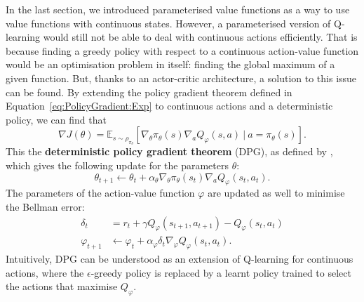 In the last section, we introduced parameterised value functions as a way to use value functions with continuous states. However, a parameterised version of Q-learning would still not be able to deal with continuous actions efficiently. That is because finding a greedy policy with respect to a continuous action-value function would be an optimisation problem in itself: finding the global maximum of a given function. But, thanks to an actor-critic architecture, a solution to this issue can be found. By extending the policy gradient theorem defined in Equation~\ref{eq:PolicyGradient:Exp} to continuous actions and a deterministic policy, we can find that
\begin{equation}
    \nabla J(\theta)=\mathbb{E}_{s\sim\rho_{\pi_\theta}}\left[\nabla_{\theta}\pi_\theta(s)\nabla_aQ_\varphi(s,a)\ |\ a=\pi_\theta(s)\right].
    \label{eq:DPG}
\end{equation}
This the \textbf{deterministic policy gradient theorem} (DPG), as defined by \cite{Silver2014_DPG}, which gives the following update for the parameters $\theta$:
\begin{equation}
    \theta_{t+1}\leftarrow\theta_t+\alpha_\theta\nabla_\theta\pi_\theta(s_t)\nabla_aQ_\varphi(s_t,a_t).
    \label{eq:DPG}
\end{equation}
The parameters of the action-value function $\varphi$ are updated as well to minimise the Bellman error:
\begin{align}
    \delta_t&=r_t+\gamma Q_\varphi(s_{t+1},a_{t+1})-Q_\varphi(s_t,a_t)\\
    \varphi_{t+1}&\leftarrow\varphi_t+\alpha_\varphi\delta_t\nabla_\varphi Q_\varphi(s_t,a_t).
\end{align}
Intuitively, DPG can be understood as an extension of Q-learning for continuous actions, where the $\epsilon$-greedy policy is replaced by a learnt policy trained to select the actions that maximise $Q_\varphi$. 



